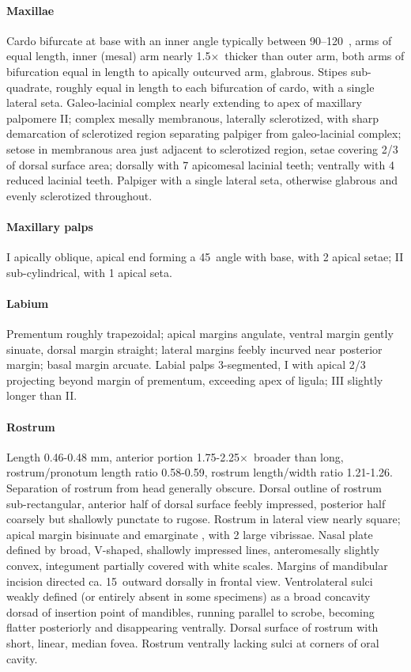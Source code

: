 \documentclass[fleqn,10pt,lineno]{wlpeerj} %
\newcommand{\td}{\textdegree~}
\newcommand{\x}{$\times$~}
\begin{document}
			\paragraph{Maxillae}
				Cardo bifurcate at base with an inner angle typically between 90–120\td, arms of equal length, inner (mesal) arm nearly 1.5\x thicker than outer arm, both arms of bifurcation equal in length to apically outcurved arm, glabrous. 
				Stipes sub-quadrate, roughly equal in length to each bifurcation of cardo, with a single lateral seta. 
				Galeo-lacinial complex nearly extending to apex of maxillary palpomere II; complex mesally membranous, laterally sclerotized, with sharp demarcation of sclerotized region separating palpiger from galeo-lacinial complex; setose in membranous area just adjacent to sclerotized
region, setae covering 2/3 of dorsal surface area; dorsally with 7 apicomesal lacinial teeth; ventrally with 4 reduced lacinial teeth. 
				Palpiger with a single lateral seta, otherwise glabrous and evenly sclerotized throughout.
			\paragraph{Maxillary palps}
				I apically oblique, apical end forming a 45\td angle with base, with 2 apical setae; II sub-cylindrical, with 1 apical seta.
			\paragraph{Labium}
				Prementum roughly trapezoidal; apical margins angulate, ventral margin gently sinuate, dorsal margin straight; lateral margins feebly incurved near posterior margin; basal margin arcuate.
				Labial palps 3-segmented, I with apical 2/3 projecting beyond margin of prementum, exceeding apex of ligula; III slightly longer than II.
			\paragraph{Rostrum}
				Length 0.46-0.48 mm, anterior portion 1.75-2.25\x broader than long, rostrum/pronotum length ratio 0.58-0.59, rostrum length/width ratio 1.21-1.26.
				Separation of rostrum from head generally obscure. 
				Dorsal outline of rostrum sub-rectangular, anterior half of dorsal surface feebly impressed, posterior half coarsely but shallowly punctate to rugose. 
				Rostrum in lateral view nearly square; apical margin bisinuate and emarginate , with 2 large vibrissae. 
				Nasal plate defined by broad, V-shaped, shallowly impressed lines, anteromesally slightly convex, integument partially covered with white scales. 
				Margins of mandibular incision directed ca. 15\td outward dorsally in frontal view. 
				Ventrolateral sulci weakly defined (or entirely absent in some specimens) as a broad concavity dorsad of insertion point of mandibles, running parallel to scrobe, becoming flatter posteriorly and disappearing ventrally.
				Dorsal surface of rostrum with  short, linear, median fovea.
				Rostrum ventrally lacking sulci at corners of oral cavity.
\end{document}
